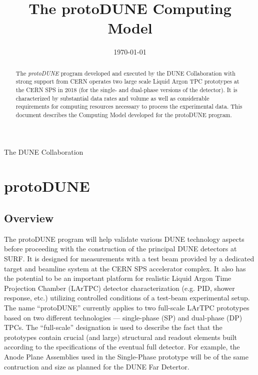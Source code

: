 \documentclass[12pt]{article}
\newcommand{\pd}{protoDUNE\xspace}
\begin{document}

\title{The \pd Computing Model}

\date{\today}

\maketitle

\centerline{The DUNE Collaboration}



\vspace{2cm}

\begin{abstract}

\noindent  The \textit{\pd} program developed and executed by the DUNE Collaboration with strong support from CERN
operates two large scale Liquid Argon TPC prototypes at the CERN SPS in 2018 (for the single- and dual-phase
versions of the detector). It is characterized by substantial data rates and volume as
well as considerable requirements for computing resources necessary to process the experimental data.
This document describes the Computing Model developed for the \pd program.
\end{abstract}


\newpage
%

\newpage
\tableofcontents
\newpage
\listoftables
\newpage
\listoffigures

\newpage
\label{sec:protodune}
\section{\pd}
\subsection{Overview}
The \pd program will help validate various DUNE \cite{sciopps} technology aspects before proceeding
with the construction of the principal DUNE detectors at SURF\cite{surf}.
It is designed for measurements with a test beam provided by a dedicated target and beamline system at the CERN SPS accelerator complex.
It also has the potential to be an important platform for realistic Liquid Argon Time Projection Chamber (LArTPC) detector characterization
(e.g. PID, shower response, etc.) utilizing controlled conditions of a test-beam experimental setup. The name ``\pd'' currently applies to two
full-scale LArTPC prototypes based on two different technologies --- single-phase (SP) and dual-phase (DP) TPCs.
The ``full-scale'' designation is used to describe the fact that the prototypes
contain crucial (and large) structural and readout elements built according to the specifications
of the eventual full detector. For example, the Anode Plane Assemblies used in the Single-Phase prototype will be
of the same contruction and size as planned for the DUNE Far Detertor.
\end{document}

